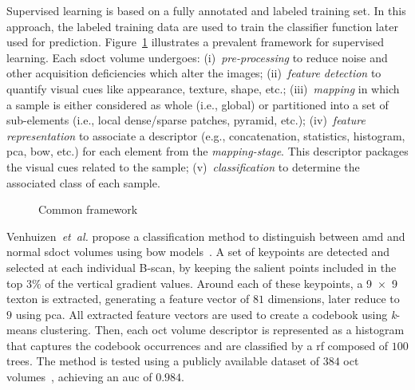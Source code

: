 Supervised learning is based on a fully annotated and labeled training set.
In this approach, the labeled training data are used to train the classifier function later used for prediction.
%
Figure~\ref{fig:ML-scheme} illustrates a prevalent framework for supervised learning.
Each \gls{sdoct} volume undergoes:
(i)~\emph{pre-processing} to reduce noise and other acquisition deficiencies which alter the images;
(ii)~\emph{feature detection} to quantify visual cues like appearance, texture, shape, etc.;
(iii)~\emph{mapping} in which a sample is either considered as whole (i.e., global) or partitioned into a set of sub-elements (i.e., local dense/sparse patches, pyramid, etc.);
(iv)~\emph{feature representation} to associate a descriptor (e.g., concatenation, statistics, histogram, \gls{pca}, \gls{bow}, etc.) for each element from the \emph{mapping-stage}.
This descriptor packages the visual cues related to the sample;
(v)~\emph{classification} to determine the associated class of each sample.


\begin{figure}
  \caption{Common framework}
  \label{fig:ML-scheme}
\end{figure}

%
Venhuizen~\textit{et~al.} propose a classification method to distinguish between \gls{amd} and normal \gls{sdoct} volumes using \gls{bow} models~\cite{Venhuizen2015}.
%
A set of keypoints are detected and selected at each individual B-scan, by keeping the salient points included in the top $3 \%$ of the vertical gradient values.
Around each of these keypoints, a \SI[product-units=repeat]{9x9}{\px} texton is extracted, generating a feature vector of $81$ dimensions, later reduce to $9$ using \gls{pca}.
All extracted feature vectors are used to create a codebook using \textit{k}-means clustering.
Then, each \gls{oct} volume descriptor is represented as a histogram that captures the codebook occurrences and are classified by a \gls{rf} composed of $100$ trees.
%
The method is tested using a publicly available dataset of $384$ \gls{oct} volumes~\cite{farsiu2014quantitative}, achieving an \gls{auc} of $0.984$.

